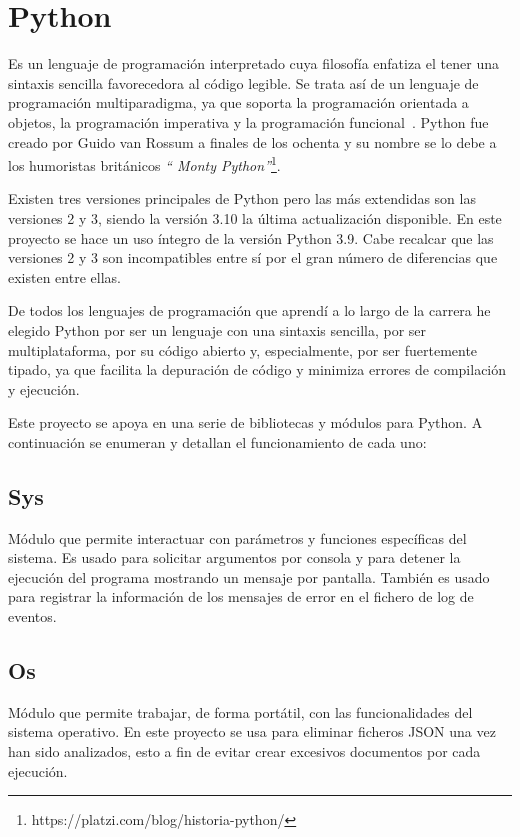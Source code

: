 \documentclass[a4paper, 12pt]{book}
\begin{document}
\section{Python}
\label{sec:Python}

Es un lenguaje de programación interpretado cuya filosofía enfatiza el tener una sintaxis sencilla favorecedora al código legible. Se trata así de un lenguaje de programación multiparadigma, ya que soporta la programación orientada a objetos, la programación imperativa y la programación funcional~\cite{pythonWeb}. Python fue creado por Guido van Rossum a finales de los ochenta y su nombre se lo debe a los humoristas británicos \textit{`` Monty Python''}\footnote{https://platzi.com/blog/historia-python/}.

Existen tres versiones principales de Python pero las más extendidas son las versiones 2 y 3, siendo la versión 3.10 la última actualización disponible. En este proyecto se hace un uso íntegro de la versión Python 3.9. Cabe recalcar que las versiones 2 y 3 son incompatibles entre sí por el gran número de diferencias que existen entre ellas.

De todos los lenguajes de programación que aprendí a lo largo de la carrera he elegido Python por ser un lenguaje con una sintaxis sencilla, por ser multiplataforma, por su código abierto y, especialmente, por ser fuertemente tipado, ya que facilita la depuración de código y minimiza errores de compilación y ejecución.

Este proyecto se apoya en una serie de bibliotecas y módulos para Python. A continuación se enumeran y detallan el funcionamiento de cada uno:

\subsection{Sys}
\label{sec:sys}

Módulo que permite interactuar con parámetros y funciones específicas del sistema. Es usado para solicitar argumentos por consola y para detener la ejecución del programa mostrando un mensaje por pantalla. También es usado para registrar la información de los mensajes de error en el fichero de log de eventos.

\subsection{Os} 
\label{sec:os}

Módulo que permite trabajar, de forma portátil, con las funcionalidades del sistema operativo. En este proyecto se usa para eliminar ficheros JSON una vez han sido analizados, esto a fin de evitar crear excesivos documentos por cada ejecución.
\end{document}
